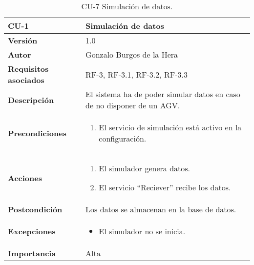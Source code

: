 \begin{table}[H]
	\centering
	\begin{tabularx}{\linewidth}{ p{} p{} }
		\toprule
		\textbf{CU-1}    & \textbf{Simulación de datos}\\
		\toprule
		\textbf{Versión}              & 1.0    \\
		\textbf{Autor}                & Gonzalo Burgos de la Hera \\
		\textbf{Requisitos asociados} & RF-3, RF-3.1, RF-3.2, RF-3.3 \\
		\textbf{Descripción}          & El sistema ha de poder simular datos en caso de no disponer de un AGV.\\
		\textbf{Precondiciones}       & 
        \begin{enumerate}
			\def\labelenumi{\arabic{enumi}.}
			\tightlist
			\item El servicio de simulación está activo en la configuración.
		\end{enumerate}\\
		\textbf{Acciones}             &
		\begin{enumerate}
			\def\labelenumi{\arabic{enumi}.}
			\tightlist
			\item El simulador genera datos.
			\item El servicio ``Reciever'' recibe los datos.
		\end{enumerate}\\
		\textbf{Postcondición}        & Los datos se almacenan en la base de datos. \\
		\textbf{Excepciones}          & 
        \begin{itemize}
			\tightlist
			\item El simulador no se inicia.
        \end{itemize} \\
		\textbf{Importancia}          & Alta \\
		\bottomrule
	\end{tabularx}
	\caption{CU-7 Simulación de datos.}
\end{table}

